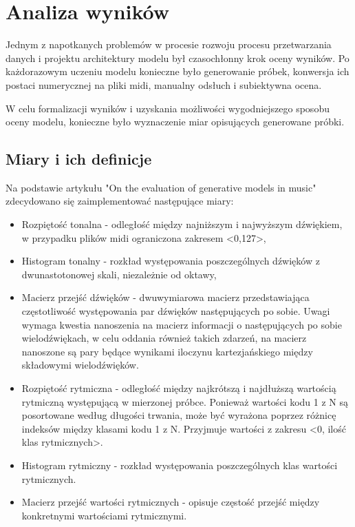 \chapter{Analiza wyników}
{

    Jednym z napotkanych problemów w procesie rozwoju procesu przetwarzania danych i projektu architektury modelu
    był czasochłonny krok oceny wyników. Po każdorazowym uczeniu modelu konieczne było generowanie próbek, 
    konwersja ich postaci numerycznej na pliki midi, manualny odsłuch i subiektywna ocena.

    W celu formalizacji wyników i uzyskania możliwości wygodniejszego sposobu oceny modelu, konieczne było wyznaczenie
    miar opisujących generowane próbki. 

    \section{Miary i ich definicje}
    {
        Na podstawie artykułu "On the evaluation of generative models in music"\cite{Yang2018OnTE} zdecydowano się zaimplementować następujące miary:
        \begin{itemize}
            \item Rozpiętość tonalna - odległość między najniższym i najwyższym dźwiękiem, w przypadku plików midi ograniczona
            zakresem <0,127>,
            \item Histogram tonalny - rozkład występowania poszczególnych dźwięków z dwunastotonowej skali, niezależnie od oktawy, 
            \item Macierz przejść dźwięków - dwuwymiarowa macierz przedstawiająca częstotliwość występowania par dźwięków następujących
            po sobie. Uwagi wymaga kwestia nanoszenia na macierz informacji o następujących po sobie wielodźwiękach, w celu oddania
            również takich zdarzeń, na macierz nanoszone są pary będące wynikami iloczynu kartezjańskiego między składowymi wielodźwięków.
            \item Rozpiętość rytmiczna - odległość między najkrótszą i najdłuższą wartością rytmiczną występującą w mierzonej próbce. 
            Ponieważ wartości kodu 1 z N są posortowane według długości trwania, może być wyrażona poprzez różnicę indeksów 
            między klasami kodu 1 z N. Przyjmuje wartości z zakresu <0, ilość klas rytmicznych>.
            \item Histogram rytmiczny - rozkład występowania poszczególnych klas wartości rytmicznych.
            \item Macierz przejść wartości rytmicznych - opisuje częstość przejść między konkretnymi wartościami rytmicznymi.
        \end{itemize}

}}
